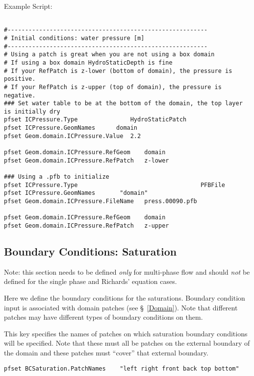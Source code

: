 Example Script:
\begin{display}\begin{verbatim}

#---------------------------------------------------------
# Initial conditions: water pressure [m]
#---------------------------------------------------------
# Using a patch is great when you are not using a box domain
# If using a box domain HydroStaticDepth is fine
# If your RefPatch is z-lower (bottom of domain), the pressure is positive.
# If your RefPatch is z-upper (top of domain), the pressure is negative.
### Set water table to be at the bottom of the domain, the top layer is initially dry
pfset ICPressure.Type				HydroStaticPatch
pfset ICPressure.GeomNames		domain
pfset Geom.domain.ICPressure.Value	2.2

pfset Geom.domain.ICPressure.RefGeom	domain
pfset Geom.domain.ICPressure.RefPatch	z-lower

### Using a .pfb to initialize
pfset ICPressure.Type                                   PFBFile
pfset ICPressure.GeomNames		 "domain"
pfset Geom.domain.ICPressure.FileName	press.00090.pfb

pfset Geom.domain.ICPressure.RefGeom	domain
pfset Geom.domain.ICPressure.RefPatch	z-upper
\end{verbatim}\end{display}


\subsection{Boundary Conditions: Saturation}
\label{Boundary Conditions: Saturation}

Note: this section needs to be defined {\em only} for multi-phase flow
and should {\em not} be defined for the single phase and Richards'
equation cases. 

Here we define the boundary conditions for the saturations.  Boundary
condition input is associated with domain patches (see \S~\ref{Domain}).
Note that different patches may have different types of boundary
conditions on them.

{
This key specifies the names of patches on which saturation boundary
conditions will be specified.  Note that these must all be patches on
the external boundary of the domain and these patches must ``cover''
that external boundary.
}
\begin{display}\begin{verbatim}
pfset BCSaturation.PatchNames    "left right front back top bottom"
\end{verbatim}\end{display}

